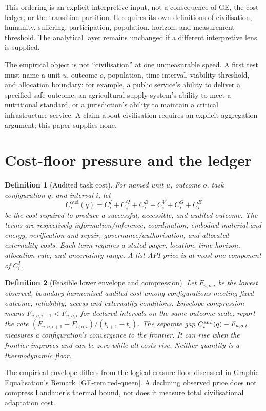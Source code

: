 \documentclass[11pt]{article}
\newtheorem{definition}{Definition}
\begin{document}
This ordering is an explicit interpretive input, not a consequence of GE, the
cost ledger, or the transition partition. It requires its own definitions of
civilisation, humanity, suffering, participation, population, horizon, and
measurement threshold. The analytical layer remains unchanged if a different
interpretive lens is supplied.

The empirical object is not ``civilisation'' at one unmeasurable speed. A first
test must name a unit $u$, outcome $o$, population, time interval, viability
threshold, and allocation boundary: for example, a public service's ability to
deliver a specified safe outcome, an agricultural supply system's ability to
meet a nutritional standard, or a jurisdiction's ability to maintain a
critical infrastructure service. A claim about civilisation requires an
explicit aggregation argument; this paper supplies none.

\section{Cost-floor pressure and the ledger}\label{sec:ledger}

\begin{definition}[Audited task cost]\label{def:audited-cost}
For named unit $u$, outcome $o$, task configuration $q$, and interval $i$, let
\[
 C^{\mathrm{aud}}_{i}(q)=C^{I}_{i}+C^{Q}_{i}+C^{B}_{i}+C^{V}_{i}+C^{G}_{i}+C^{E}_{i}
\]
be the cost required to produce a successful, accessible, and audited outcome.
The terms are respectively information/inference, coordination, embodied
material and energy, verification and repair, governance/authorisation, and
allocated externality costs. Each term requires a stated payer, location,
time horizon, allocation rule, and uncertainty range. A list API price is at
most one component of $C^{I}_{i}$.
\end{definition}

\begin{definition}[Feasible lower envelope and compression]\label{def:envelope}
Let $F_{u,o,i}$ be the lowest observed, boundary-harmonised audited cost
among configurations meeting fixed outcome, reliability, access and
externality conditions. Envelope compression means $F_{u,o,i+1}<F_{u,o,i}$
for declared intervals on the same outcome scale; report the rate
$(F_{u,o,i+1}-F_{u,o,i})/(t_{i+1}-t_i)$.
The separate gap $C_i^{\rm aud}(q)-F_{u,o,i}$ measures a configuration's
convergence to the frontier. It can rise when the frontier improves and
can be zero while all costs rise. Neither quantity is a thermodynamic floor.
\end{definition}
The empirical envelope differs from the logical-erasure floor discussed in
Graphic Equalisation's Remark~\ref{GE-rem:red-queen}. A declining observed
price does not compress Landauer's thermal bound, nor does it measure total
civilisational adaptation cost.
\end{document}
